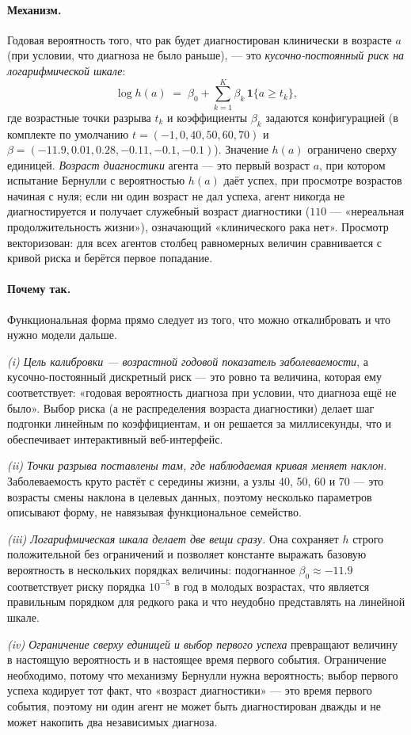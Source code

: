 \documentclass[12pt,a4paper]{article}
\newcommand{\mech}[1]{\paragraph{Механизм.} #1}
\newcommand{\why}[1]{\paragraph{Почему так.} #1}
\begin{document}
\mech{Годовая вероятность того, что рак будет диагностирован клинически в возрасте $a$ (при условии, что
диагноза не было раньше), --- это \emph{кусочно-постоянный риск на логарифмической шкале}:
\[
\log h(a) \;=\; \beta_0 + \sum_{k=1}^{K}\beta_k\,\mathbf{1}\{a \ge t_k\},
\]
где возрастные точки разрыва $t_k$ и коэффициенты $\beta_k$ задаются конфигурацией (в комплекте по умолчанию
$t = (-1,0,40,50,60,70)$ и $\beta = (-11.9,0.01,0.28,-0.11,-0.1,-0.1)$). Значение $h(a)$ ограничено сверху
единицей. \emph{Возраст диагностики} агента --- это первый возраст $a$, при котором испытание Бернулли с
вероятностью $h(a)$ даёт успех, при просмотре возрастов начиная с нуля; если ни один возраст не дал успеха,
агент никогда не диагностируется и получает служебный возраст диагностики ($110$ --- «нереальная
продолжительность жизни»), означающий «клинического рака нет». Просмотр векторизован: для всех агентов
столбец равномерных величин сравнивается с кривой риска и берётся первое попадание.}

\why{Функциональная форма прямо следует из того, что можно откалибровать и что нужно модели дальше.

\emph{(i) Цель калибровки --- возрастной годовой показатель заболеваемости}, а кусочно-постоянный
дискретный риск --- это ровно та величина, которая ему соответствует: «годовая вероятность диагноза при
условии, что диагноза ещё не было». Выбор риска (а не распределения возраста диагностики) делает шаг
подгонки линейным по коэффициентам, и он решается за миллисекунды, что и обеспечивает интерактивный
веб-интерфейс.

\emph{(ii) Точки разрыва поставлены там, где наблюдаемая кривая меняет наклон.} Заболеваемость круто
растёт с середины жизни, а узлы 40, 50, 60 и 70 --- это возрасты смены наклона в целевых данных, поэтому
несколько параметров описывают форму, не навязывая функциональное семейство.

\emph{(iii) Логарифмическая шкала делает две вещи сразу.} Она сохраняет $h$ строго положительной без
ограничений и позволяет константе выражать базовую вероятность в нескольких порядках величины:
подогнанное $\beta_0 \approx -11.9$ соответствует риску порядка $10^{-5}$ в год в молодых возрастах, что
является правильным порядком для редкого рака и что неудобно представлять на линейной шкале.

\emph{(iv) Ограничение сверху единицей и выбор первого успеха} превращают величину в настоящую вероятность
и в настоящее время первого события. Ограничение необходимо, потому что механизму Бернулли нужна
вероятность; выбор первого успеха кодирует тот факт, что «возраст диагностики» --- это время первого
события, поэтому ни один агент не может быть диагностирован дважды и не может накопить два независимых
диагноза.}
\end{document}
